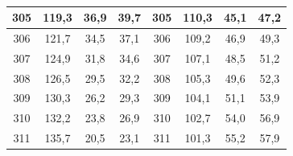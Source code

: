 \documentclass[a4paper,12pt]{article} %
\begin{document}
\begin{enumerate}
\begin{table}[h!]
\begin{tabular}{|c|c|c|c|c|c|c|c|}
				305    & 119,3                & 36,9                 & 39,7                  & 305    & 110,3                & 45,1                 & 47,2                  \\ \hline
				306    & 121,7                & 34,5                 & 37,1                  & 306    & 109,2                & 46,9                 & 49,3                  \\ \hline
				307    & 124,9                & 31,8                 & 34,6                  & 307    & 107,1                & 48,5                 & 51,2                  \\ \hline
				308    & 126,5                & 29,5                 & 32,2                  & 308    & 105,3                & 49,6                 & 52,3                  \\ \hline
				309    & 130,3                & 26,2                 & 29,3                  & 309    & 104,1                & 51,1                 & 53,9                  \\ \hline
				310    & 132,2                & 23,8                 & 26,9                  & 310    & 102,7                & 54,0                 & 56,9                  \\ \hline
				311    & 135,7                & 20,5                 & 23,1                  & 311    & 101,3                & 55,2                 & 57,9                  \\ \hline
			\end{tabular}
		\caption{}
		\end{table}
	

\end{enumerate}
\end{document}
